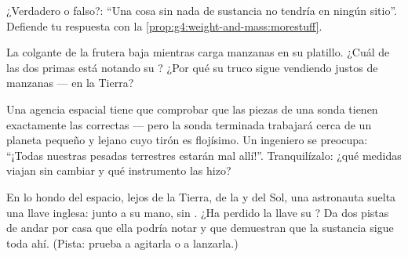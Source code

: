 \begin{exercise}[$\star$]\label{exo:g4:weight-and-mass:8}
¿Verdadero o falso?: ``Una cosa sin nada de sustancia no tendría
 en ningún sitio''. Defiende tu respuesta con la
\cref{prop:g4:weight-and-mass:morestuff}.
\end{exercise}

\begin{exercise}[$\star$]\label{exo:g4:weight-and-mass:9}
La  colgante de la frutera baja mientras carga manzanas en su
platillo. ¿Cuál de las dos primas está notando su ? ¿Por qué su
truco sigue vendiendo  justos de manzanas --- en la Tierra?
\end{exercise}

\begin{exercise}[$\star\star$]\label{exo:g4:weight-and-mass:10}
Una agencia espacial tiene que comprobar que las piezas de una sonda
tienen exactamente las  correctas --- pero la sonda terminada
trabajará cerca de un planeta pequeño y lejano cuyo tirón es
flojísimo. Un ingeniero se preocupa: ``¡Todas nuestras pesadas
terrestres estarán mal allí!''. Tranquilízalo: ¿qué medidas viajan sin
cambiar y qué instrumento las hizo?
\end{exercise}

\begin{exercise}[$\star\star$]\label{exo:g4:weight-and-mass:11}
En lo hondo del espacio, lejos de la Tierra, de la  y del Sol,
una astronauta suelta una llave inglesa:  junto a su mano, sin
. ¿Ha perdido la llave su ? Da dos pistas de andar por casa
que ella podría notar y que demuestran que la sustancia sigue toda
ahí. (Pista: prueba a agitarla o a lanzarla.)
\end{exercise}
